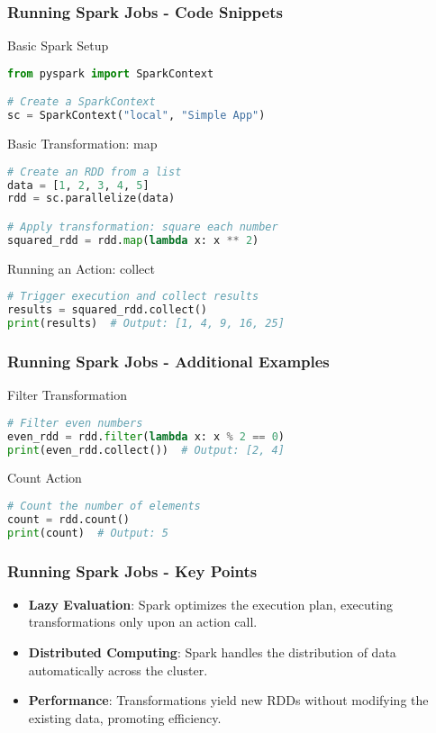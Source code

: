 \documentclass[aspectratio=169]{beamer}
\begin{document}
\begin{frame}[fragile]
    \frametitle{Running Spark Jobs - Code Snippets}
    \begin{block}{Basic Spark Setup}
    \begin{lstlisting}[language=python]
from pyspark import SparkContext

# Create a SparkContext
sc = SparkContext("local", "Simple App")
    \end{lstlisting}
    \end{block}

    \begin{block}{Basic Transformation: map}
    \begin{lstlisting}[language=python]
# Create an RDD from a list
data = [1, 2, 3, 4, 5]
rdd = sc.parallelize(data)

# Apply transformation: square each number
squared_rdd = rdd.map(lambda x: x ** 2)
    \end{lstlisting}
    \end{block}

    \begin{block}{Running an Action: collect}
    \begin{lstlisting}[language=python]
# Trigger execution and collect results
results = squared_rdd.collect()
print(results)  # Output: [1, 4, 9, 16, 25]
    \end{lstlisting}
    \end{block}
\end{frame}

\begin{frame}[fragile]
    \frametitle{Running Spark Jobs - Additional Examples}
    \begin{block}{Filter Transformation}
    \begin{lstlisting}[language=python]
# Filter even numbers
even_rdd = rdd.filter(lambda x: x % 2 == 0)
print(even_rdd.collect())  # Output: [2, 4]
    \end{lstlisting}
    \end{block}

    \begin{block}{Count Action}
    \begin{lstlisting}[language=python]
# Count the number of elements
count = rdd.count()
print(count)  # Output: 5
    \end{lstlisting}
    \end{block}
\end{frame}

\begin{frame}
    \frametitle{Running Spark Jobs - Key Points}
    \begin{itemize}
        \item \textbf{Lazy Evaluation}: Spark optimizes the execution plan, executing transformations only upon an action call.
        \item \textbf{Distributed Computing}: Spark handles the distribution of data automatically across the cluster.
        \item \textbf{Performance}: Transformations yield new RDDs without modifying the existing data, promoting efficiency.
    \end{itemize}
\end{frame}
\end{document}

